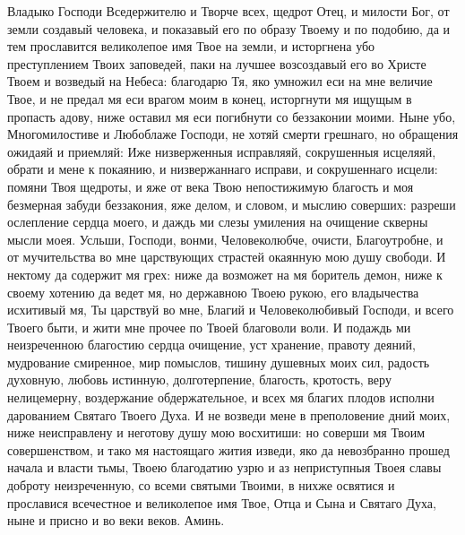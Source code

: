 \begin{mymulticols}
Владыко Господи Вседержителю и Творче всех, щедрот Отец, и милости Бог, от земли создавый человека, и показавый его по образу Твоему и по подобию, да и тем прославится великолепое имя Твое на земли, и исторгнена убо преступлением Твоих заповедей, паки на лучшее возсоздавый его во Христе Твоем и возведый на Небеса: благодарю Тя, яко умножил еси на мне величие Твое, и не предал мя еси врагом моим в конец, исторгнути мя ищущым в пропасть адову, ниже оставил мя еси погибнути со беззаконии моими. Ныне убо, Многомилостиве и Любоблаже Господи, не хотяй смерти грешнаго, но обращения ожидаяй и приемляй: Иже низверженныя исправляяй, сокрушенныя исцеляяй, обрати и мене к покаянию, и низвержаннаго исправи, и сокрушеннаго исцели: помяни Твоя щедроты, и яже от века Твою непостижимую благость и моя безмерная забуди беззакония, яже делом, и словом, и мыслию соверших: разреши ослепление сердца моего, и даждь ми слезы умиления на очищение скверны мысли моея. Усльши, Господи, вонми, Человеколюбче, очисти, Благоутробне, и от мучительства во мне царствующих страстей окаянную мою душу свободи. И нектому да содержит мя грех: ниже да возможет на мя боритель демон, ниже к своему хотению да ведет мя, но державною Твоею рукою, его владычества исхитивый мя, Ты царствуй во мне, Благий и Человеколюбивый Господи, и всего Твоего быти, и жити мне прочее по Твоей благоволи воли. И подаждь ми неизреченною благостию сердца очищение, уст хранение, правоту деяний, мудрование смиренное, мир помыслов, тишину душевных моих сил, радость духовную, любовь истинную, долготерпение, благость, кротость, веру нелицемерну, воздержание обдержательное, и всех мя благих плодов исполни дарованием Святаго Твоего Духа. И не возведи мене в преполовение дний моих, ниже неисправлену и неготову душу мою восхитиши: но соверши мя Твоим совершенством, и тако мя настоящаго жития изведи, яко да невозбранно прошед начала и власти тьмы, Твоею благодатию узрю и аз неприступныя Твоея славы доброту неизреченную, со всеми святыми Твоими, в нихже освятися и прославися всечестное и великолепое имя Твое, Отца и Сына и Святаго Духа, ныне и присно и во веки веков. Аминь.

\end{mymulticols}

\mychapterending


